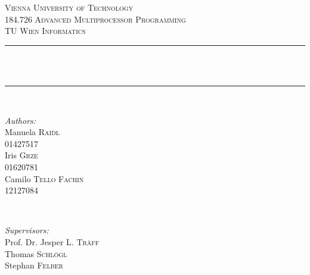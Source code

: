 \begin{titlepage}

\newcommand{\HRule}{\rule{\linewidth}{0.5mm}} %

\center %
 

\textsc{\LARGE Vienna University of Technology}\\[1.5cm] %
\textsc{\Large 184.726 Advanced Multiprocessor Programming}\\[0.5cm] %
\textsc{\large TU Wien Informatics}\\[0.5cm] %


\HRule \\[0.5cm]
{ \huge \bfseries \doctitle}\\[1mm] %
\HRule \\[0.5cm]
 
\hfill

\begin{minipage}{0.58\textwidth}
\begin{flushleft} \large
\emph{Authors:}\\
\null
Manuela \textsc{Raidl}\\
01427517 \\
\null
Iris \textsc{Grze}\\
01620781 \\
\null
Camilo \textsc{Tello Fachin}\\
12127084 \\

\end{flushleft}
\end{minipage}
~
\begin{minipage}{0.4\textwidth}
\begin{flushleft} \large
\emph{Supervisors:} \\
\null
Prof. Dr. Jesper L. \textsc{Träff} \\ %
\null
Thomas \textsc{Schlögl} \\ %
\null
Stephan \textsc{Felber} \\ %
\null
\end{flushleft}
\end{minipage}\\[1.5cm]
\hfill


\end{titlepage}
